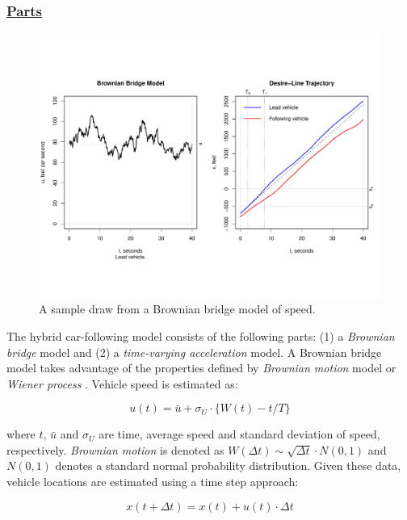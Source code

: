 \documentclass[Proceedings]{ascelike}
\begin{document}
\subsubsection{\underline{Parts} }

\begin{figure}
\centering
\includegraphics[width = 7in]{Rplot03.pdf}
\caption{A sample draw from a Brownian bridge model of speed. }
\label{bbmodel}
\end{figure}


The  hybrid car-following model consists of the following parts: (1)  a \emph{Brownian bridge} model and (2) a \emph{time-varying acceleration} model. A Brownian bridge model  takes advantage of the properties defined by \emph{Brownian motion} model or  \emph{Wiener process} \cite{iacus}. Vehicle speed is estimated as:

\begin {equation}
u(t)  = \bar{u} + \sigma_U \cdot \big\{ W(t) - t/T \big\} \label{eq:eq1}
\end{equation}

\noindent where $t$, $\bar{u}$ and $\sigma_U$ are time, average speed and standard deviation of speed, respectively. \emph{Brownian motion} is denoted as $W(\Delta t) \sim \sqrt{\Delta t} \cdot N(0,1)$ and $N(0,1)$ denotes a standard normal probability distribution.  Given these data, vehicle locations are estimated using a time step approach:

\begin {equation}
x(t + \Delta t)  = x(t) + u(t) \cdot \Delta t  \label{eq:eq2}
\end{equation}
\end{document}
